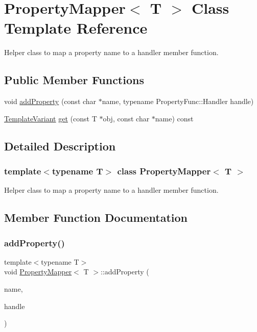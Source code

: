 \hypertarget{class_property_mapper}{}\section{Property\+Mapper$<$ T $>$ Class Template Reference}
\label{class_property_mapper}


Helper class to map a property name to a handler member function.  


\subsection*{Public Member Functions}
\begin{DoxyCompactItemize}
\item 
void \mbox{\hyperlink{class_property_mapper_a24cd857dc07114050338338964006e5f}{add\+Property}} (const char $\ast$name, typename Property\+Func\+::\+Handler handle)
\item 
\mbox{\hyperlink{class_template_variant}{Template\+Variant}} \mbox{\hyperlink{class_property_mapper_a7e712b52a909dbaea00d8cca2b4bc0d4}{get}} (const T $\ast$obj, const char $\ast$name) const
\end{DoxyCompactItemize}


\subsection{Detailed Description}
\subsubsection*{template$<$typename T$>$\newline
class Property\+Mapper$<$ T $>$}

Helper class to map a property name to a handler member function. 

\subsection{Member Function Documentation}
\mbox{\label{class_property_mapper_a24cd857dc07114050338338964006e5f}} 
\subsubsection{\texorpdfstring{addProperty()}{addProperty()}}
{\footnotesize\ttfamily template$<$typename T$>$ \\
void \mbox{\hyperlink{class_property_mapper}{Property\+Mapper}}$<$ T $>$\+::add\+Property (\begin{DoxyParamCaption}\item[{const char $\ast$}]{name,  }\item[{typename Property\+Func\+::\+Handler}]{handle }\end{DoxyParamCaption})\hspace{0.3cm}{\ttfamily [inline]}}

